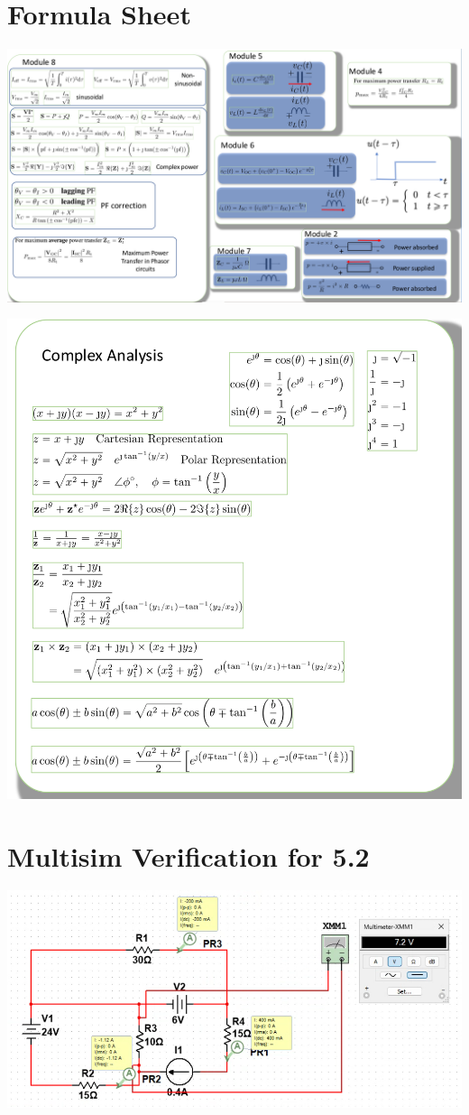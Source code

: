 \documentclass[12pt,letterpaper]{article} \usepackage{amsmath} \usepackage{graphicx} \usepackage[margin=1in]{geometry} \usepackage{longtable}  \usepackage{amssymb}
\begin{document}
	\section{Formula Sheet}
	\begin{center}
		\includegraphics[width=0.99\linewidth]{formulaside1}
	\end{center}
	\begin{center}
		\includegraphics[width=0.5\linewidth]{formulaside2}
	\end{center}
	
	
	\section{Multisim Verification for 5.2}
	\begin{center}
		\includegraphics[width=0.8\linewidth]{ex3-5}
	\end{center}
	
	
	
	
\end{document}
